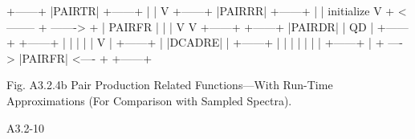 \begin{center}
\begin{boxedverbatim}



                             +------+
                             |PAIRTR|
                             +------+
                                 |
                                 |
                                 V
                             +------+
                             |PAIRRR|
                             +------+
                                 |
                                 |
                      initialize V
                     + <-------- + -------> +
                     |  PAIRFR              |
                     |                      |
                     V                      V
                  +------+              +------+
                  |PAIRDR|              |  QD  |
                  +------+              +------+
                     |                      |
                     |                      |
                     |                      V
                     |                  +------+
                     |                  |DCADRE|
                     |                  +------+
                     |                      |
                     |                      |
                     |                      |
                     |       +------+       |
                     + ----> |PAIRFR| <---- +
                             +------+
 
 
     Fig. A3.2.4b  Pair Production Related Functions---With
                  Run-Time Approximations (For Comparison
                  with Sampled Spectra).
 






 A3.2-10
\end{boxedverbatim} 
\end{center}
